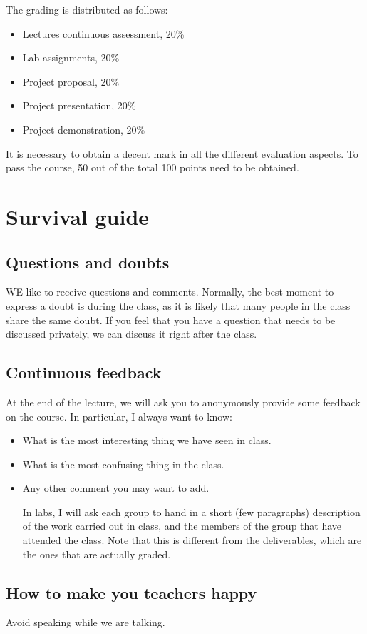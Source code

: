 The grading is distributed as follows:
\begin{itemize}
\item Lectures continuous assessment, 20\%
\item Lab assignments, 20\%
\item Project proposal, 20\%
\item Project presentation, 20\%
\item Project demonstration, 20\%
\end{itemize}

It is necessary to obtain a decent mark in all the different evaluation aspects.
To pass the course, 50 out of the total 100 points need to be obtained.

\section{Survival guide}

\subsection{Questions and doubts}
WE like to receive questions and comments.
Normally, the best moment to express a doubt is during the class, as it is likely that many people in the class share the same doubt.
If you feel that you have a question that needs to be discussed privately, we can discuss it right after the class.

\subsection{Continuous feedback}
At the end of the lecture, we will ask you to anonymously provide some feedback on the course. 
In particular, I always want to know:
\begin{itemize}
\item What is the most interesting thing we have seen in class.
\item What is the most confusing thing in the class.
\item Any other comment you may want to add.

In labs, I will ask each group to hand in a short (few paragraphs) description of the work carried out in class, and the members of the group that have attended the class.
Note that this is different from the deliverables, which are the ones that are actually graded.
\end{itemize}

\subsection{How to make you teachers happy}

Avoid speaking while we are talking.
